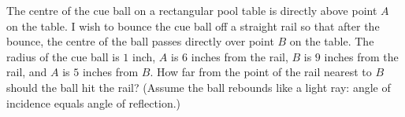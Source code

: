 The centre of the cue ball on a rectangular pool table is directly above point $A$ on the table. I wish to bounce the cue ball off a straight rail so that after the bounce, the centre of the ball passes directly over point $B$ on the table. The radius of the cue ball is $1$ inch, $A$ is $6$ inches from the rail, $B$ is $9$ inches from the rail, and $A$ is $5$ inches from $B$. How far from the point of the rail nearest to $B$ should the ball hit the rail? (Assume the ball rebounds like a light ray: angle of incidence equals angle of reflection.)
